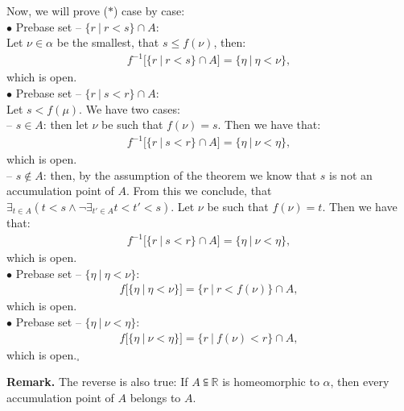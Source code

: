 Now, we will prove ($\ast$) case by case: \\

$\bullet$ Prebase set -- $\{r\ |\ r<s\} \cap A$: \\
Let $\nu \in \alpha$ be the smallest, that $s \leq f(\nu)$, then:
\begin{align*}
f^{-1}[\{r\ |\ r<s\} \cap A] = \{\eta\ |\ \eta<\nu\},
\end{align*}
which is open. \\ 

$\bullet$ Prebase set -- $\{r\ |\ s<r\} \cap A$: \\
Let $s < f(\mu)$. We have two cases: \\
-- $s \in A$: then let $\nu$ be such that $f(\nu)=s$. Then we have that:
\begin{align*}
f^{-1}[\{r\ |\ s<r\} \cap A] = \{\eta\ |\ \nu < \eta \},
\end{align*}
which is open. \\
-- $s \not\in A$: then, by the assumption of the theorem we know that $s$ is not an accumulation 
point of $A$. From this we conclude, that 
$\exists_{t\in A} (t<s \land \neg \exists_{t' \in A} t<t'<s)$. Let $\nu$ be such that $f(\nu) = t$. 
Then we have that:
\begin{align*}
f^{-1}[\{r\ |\ s<r\} \cap A] = \{\eta\ |\ \nu < \eta \},
\end{align*}
which is open. \\

$\bullet$ Prebase set -- $\{\eta\ |\ \eta<\nu\}$: \\
\begin{align*}
f[\{\eta\ |\ \eta<\nu\}] = \{r\ |\ r<f(\nu)\} \cap A,
\end{align*}
which is open. \\

$\bullet$ Prebase set -- $\{\eta\ |\ \nu<\eta\}$: \\
\begin{align*}
f[\{\eta\ |\ \nu<\eta\}] = \{r\ |\ f(\nu)<r\} \cap A,
\end{align*}
which is open.$_\square$

\textbf{Remark.} 
The reverse is also true: If $A\subseteqq \mathbb{R}$ is homeomorphic to $\alpha$, then 
every accumulation point of $A$ belongs to $A$. 




